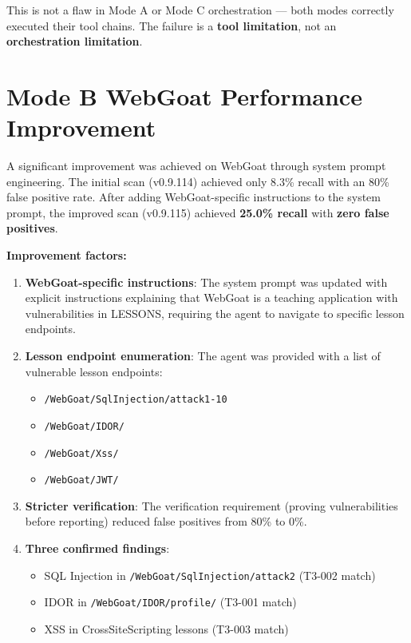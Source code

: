 \documentclass[12pt,a4paper,oneside]{book}
\begin{document}
This is not a flaw in Mode A or Mode C orchestration — both modes correctly executed their tool chains. The failure is a \textbf{tool limitation}, not an \textbf{orchestration limitation}.

\section{Mode B WebGoat Performance Improvement}

A significant improvement was achieved on WebGoat through system prompt engineering. The initial scan (v0.9.114) achieved only 8.3\% recall with an 80\% false positive rate. After adding WebGoat-specific instructions to the system prompt, the improved scan (v0.9.115) achieved \textbf{25.0\% recall} with \textbf{zero false positives}.

\textbf{Improvement factors:}

\begin{enumerate}
    \item \textbf{WebGoat-specific instructions}: The system prompt was updated with explicit instructions explaining that WebGoat is a teaching application with vulnerabilities in LESSONS, requiring the agent to navigate to specific lesson endpoints.
    
    \item \textbf{Lesson endpoint enumeration}: The agent was provided with a list of vulnerable lesson endpoints:
    \begin{itemize}
        \item \texttt{/WebGoat/SqlInjection/attack1-10}
        \item \texttt{/WebGoat/IDOR/}
        \item \texttt{/WebGoat/Xss/}
        \item \texttt{/WebGoat/JWT/}
    \end{itemize}
    
    \item \textbf{Stricter verification}: The verification requirement (proving vulnerabilities before reporting) reduced false positives from 80\% to 0\%.
    
    \item \textbf{Three confirmed findings}:
    \begin{itemize}
        \item SQL Injection in \texttt{/WebGoat/SqlInjection/attack2} (T3-002 match)
        \item IDOR in \texttt{/WebGoat/IDOR/profile/} (T3-001 match)
        \item XSS in CrossSiteScripting lessons (T3-003 match)
    \end{itemize}
\end{enumerate}
\end{document}
